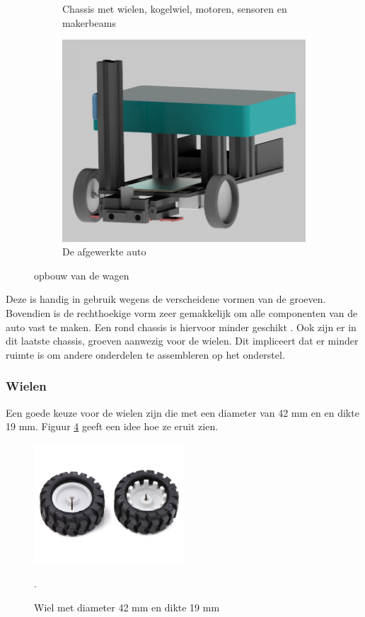 \documentclass[a4paper,twoside,kulak]{kulakreport} %
\begin{document}
\begin{figure}[ht]
\begin{subfigure}[b]{0.5\linewidth}
		\caption{Chassis met wielen, kogelwiel, motoren, sensoren en makerbeams} 
		\label{opbouw3} 
	\end{subfigure}%
	\begin{subfigure}[b]{0.5\linewidth}
		\centering
		\includegraphics[width=0.75\linewidth]{4Volledig} 
		\caption{De afgewerkte auto} 
		\label{opbouw4} 
	\end{subfigure} 
	\caption{opbouw van de wagen}
	\label{opbouwvanwagen} 
\end{figure}

Deze is handig in gebruik wegens de verscheidene vormen van de groeven. %
Bovendien is de rechthoekige vorm zeer gemakkelijk om alle componenten van de auto vast te maken. Een rond chassis is hiervoor minder geschikt \cite{RobotChassis}. Ook zijn er in dit laatste chassis, groeven aanwezig voor de wielen. Dit impliceert dat er minder ruimte is om andere onderdelen te assembleren op het onderstel. %
\label{Chassis}

\subsubsection{Wielen}
Een goede keuze voor de wielen zijn die met een diameter van 42 mm en en dikte 19 mm.
Figuur \ref{fig:wiel} geeft een idee hoe ze eruit zien.

\begin{figure}
	\includegraphics[width=0.5\textwidth]{wielen}
	\centering
	\caption{Wiel met diameter 42 mm en dikte 19 mm} 
	\cite{Wiel42x19mm}.
	\label{fig:wiel}
\end{figure}
\end{document}
